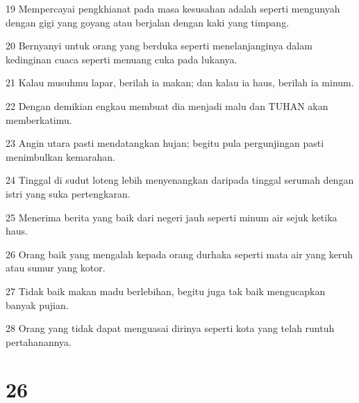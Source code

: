 \par 19 Mempercayai pengkhianat pada masa kesusahan adalah seperti mengunyah dengan gigi yang goyang atau berjalan dengan kaki yang timpang.
\par 20 Bernyanyi untuk orang yang berduka seperti menelanjanginya dalam kedinginan cuaca seperti menuang cuka pada lukanya.
\par 21 Kalau musuhmu lapar, berilah ia makan; dan kalau ia haus, berilah ia minum.
\par 22 Dengan demikian engkau membuat dia menjadi malu dan TUHAN akan memberkatimu.
\par 23 Angin utara pasti mendatangkan hujan; begitu pula pergunjingan pasti menimbulkan kemarahan.
\par 24 Tinggal di sudut loteng lebih menyenangkan daripada tinggal serumah dengan istri yang suka pertengkaran.
\par 25 Menerima berita yang baik dari negeri jauh seperti minum air sejuk ketika haus.
\par 26 Orang baik yang mengalah kepada orang durhaka seperti mata air yang keruh atau sumur yang kotor.
\par 27 Tidak baik makan madu berlebihan, begitu juga tak baik mengucapkan banyak pujian.
\par 28 Orang yang tidak dapat menguasai dirinya seperti kota yang telah runtuh pertahanannya.

\chapter{26}

